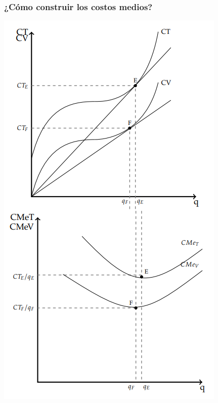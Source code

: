 \documentclass{beamer}
\begin{document}
\begin{frame}
\frametitle{¿Cómo construir los costos medios?}
\centering
\includegraphics[scale=0.4]{../Figures/C13.6.png}
\end{frame}
\end{document}
